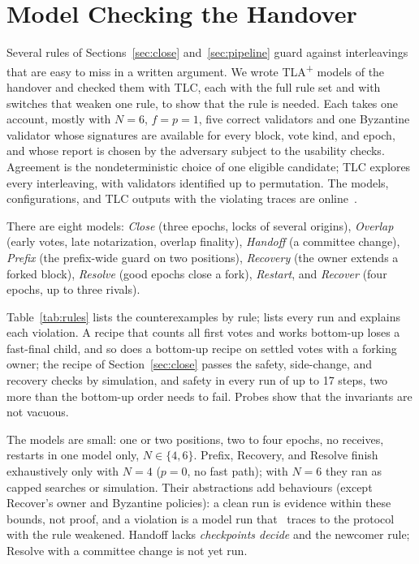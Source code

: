 \section{Model Checking the Handover}
\label{sec:mc}
Several rules of Sections~\ref{sec:close} and~\ref{sec:pipeline} guard against interleavings that are easy to miss in a written argument. We wrote TLA\textsuperscript{+} models of the handover and checked them with TLC, each with the full rule set and with switches that weaken one rule, to show that the rule is needed. Each takes one account, mostly with $N=6$, $f=p=1$, five correct validators and one Byzantine validator whose signatures are available for every block, vote kind, and epoch, and whose report is chosen by the adversary subject to the usability checks. Agreement is the nondeterministic choice of one eligible candidate; TLC explores every interleaving, with validators identified up to permutation. The models, configurations, and TLC outputs with the violating traces are online~\cite{extended}.

There are eight models: \emph{Close} (three epochs, locks of several origins), \emph{Overlap} (early votes, late notarization, overlap finality), \emph{Handoff} (a committee change), \emph{Prefix} (the prefix-wide guard on two positions), \emph{Recovery} (the owner extends a forked block), \emph{Resolve} (good epochs close a fork), \emph{Restart}, and \emph{Recover} (four epochs, up to three rivals).

Table~\ref{tab:rules} lists the counterexamples by rule; \cite{extended} lists every run and explains each violation. A recipe that counts all first votes and works bottom-up loses a fast-final child, and so does a bottom-up recipe on settled votes with a forking owner; the recipe of Section~\ref{sec:close} passes the safety, side-change, and recovery checks by simulation, and safety in every run of up to 17 steps, two more than the bottom-up order needs to fail. Probes show that the invariants are not vacuous.

The models are small: one or two positions, two to four epochs, no receives, restarts in one model only, $N\in\{4,6\}$. Prefix, Recovery, and Resolve finish exhaustively only with $N=4$ ($p=0$, no fast path); with $N=6$ they ran as capped searches or simulation. Their abstractions add behaviours (except Recover's owner and Byzantine policies): a clean run is evidence within these bounds, not proof, and a violation is a model run that~\cite{extended} traces to the protocol with the rule weakened. Handoff lacks \emph{checkpoints decide} and the newcomer rule; Resolve with a committee change is not yet run.
